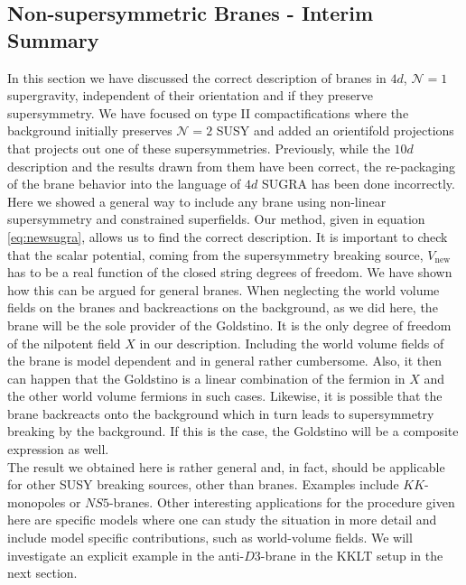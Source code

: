 \documentclass[a4paper,12pt]{report}
\begin{document}
\subsection{Non-supersymmetric Branes - Interim Summary}
In this section we have discussed the correct description of branes in $4d$, $\mathcal{N}=1$ supergravity, independent of their orientation and if they preserve supersymmetry. We have focused on type II compactifications where the background initially preserves $\mathcal{N}=2$ SUSY and added an orientifold projections that projects out one of these supersymmetries. Previously, while the $10d$ description and the results drawn from them have been correct, the re-packaging of  the brane behavior into the language of $4d$ SUGRA has been done incorrectly. Here we showed a general way to include any brane using non-linear supersymmetry and constrained superfields. Our method, given in equation \eqref{eq:newsugra}, allows us to find the correct description. It is important to check that the scalar potential, coming from the supersymmetry breaking source, $V_{\text{new}}$ has to be a real function of the closed string degrees of freedom. We have shown how this can be argued for general branes. When neglecting the world volume fields on the branes and backreactions on the background, as we did here, the brane will be the sole provider of the Goldstino. It is the only degree of freedom of the nilpotent field $X$ in our description. Including the world volume fields of the brane is model dependent and in general rather cumbersome. Also, it then can happen that the Goldstino is a linear combination of the fermion in $X$ and the other world volume fermions in such cases. Likewise, it is possible that the brane backreacts onto the background which in turn leads to supersymmetry breaking by the background. If this is the case, the Goldstino will be a composite expression as well.\\
The result we obtained here is rather general and, in fact, should be applicable for other SUSY breaking sources, other than branes. Examples include $KK$-monopoles or $NS5$-branes. Other interesting applications for the procedure given here are specific models where one can study the situation in more detail and include model specific contributions, such as world-volume fields. We will investigate an explicit example in the anti-$D3$-brane in the KKLT setup in the next section.
\end{document}
